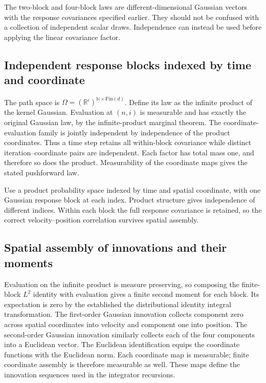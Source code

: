 \documentclass[11pt,a4paper]{report}
\begin{document}
The two-block and four-block laws are different-dimensional Gaussian vectors with the response covariances specified earlier. They should not be confused with a collection of independent scalar draws. Independence can instead be used before applying the linear covariance factor.

\subsection{\texorpdfstring{Independent response blocks indexed by time and coordinate}{Independent response blocks indexed by time and coordinate}}
\label{report-step-KineticLangevin-Gaussian-lean-4}


The path space is \(\Omega=(\mathbb R^{\iota})^{\mathbb N\times\mathrm{Fin}(d)}\). Define its law as the infinite product of the kernel Gaussian. Evaluation at \((n,i)\) is measurable and has exactly the original Gaussian law, by the infinite-product marginal theorem. The coordinate-evaluation family is jointly independent by independence of the product coordinates. Thus a time step retains all within-block covariance while distinct iteration–coordinate pairs are independent. Each factor has total mass one, and therefore so does the product. Measurability of the coordinate maps gives the stated pushforward law.



Use a product probability space indexed by time and spatial coordinate, with one Gaussian response block at each index. Product structure gives independence of different indices. Within each block the full response covariance is retained, so the correct velocity–position correlation survives spatial assembly.

\subsection{\texorpdfstring{Spatial assembly of innovations and their moments}{Spatial assembly of innovations and their moments}}
\label{report-step-KineticLangevin-Gaussian-lean-5}


Evaluation on the infinite product is measure preserving, so composing the finite-block \(L^{2}\) identity with evaluation gives a finite second moment for each block. Its expectation is zero by the established the distributional identity integral transformation. The first-order Gaussian innovation collects component zero across spatial coordinates into velocity and component one into position. The second-order Gaussian innovation similarly collects each of the four components into a Euclidean vector. The Euclidean identification equips the coordinate functions with the Euclidean norm. Each coordinate map is measurable; finite coordinate assembly is therefore measurable as well. These maps define the innovation sequences used in the integrator recursions.
\end{document}
